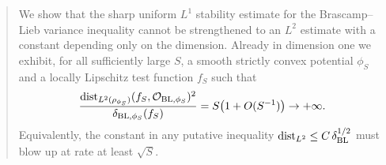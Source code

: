 \begin{abstract}
We show that the sharp uniform $L^1$ stability estimate for the Brascamp--Lieb
variance inequality cannot be strengthened to an $L^2$ estimate with a constant
depending only on the dimension. Already in dimension one we exhibit, for all
sufficiently large $S$, a smooth strictly convex potential $\phi_S$ and a
locally Lipschitz test function $f_S$ such that
\[
  \frac{\dist_{L^2(\rho_{\phi_S})}(f_S,\mathcal O_{\mathrm{BL},\phi_S})^2}
       {\delta_{\mathrm{BL},\phi_S}(f_S)}
  = S\bigl(1+O(S^{-1})\bigr)\to+\infty.
\]
Equivalently, the constant in any putative inequality
$\dist_{L^2}\le C\,\delta_{\mathrm{BL}}^{1/2}$ must blow up at rate at least
$\sqrt S$.
\end{abstract}
